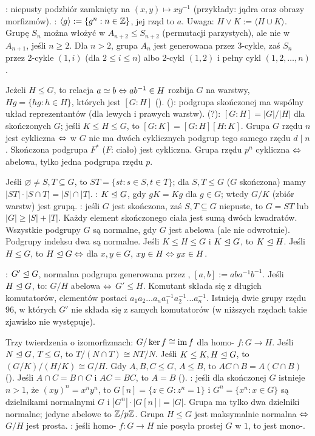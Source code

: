 :  niepusty podzbiór zamknięty na $(x, y) \mapsto xy^{-1}$ (przykłady: jądra oraz obrazy morfizmów).
: $\langle g \rangle := \{g^n : n \in \mathbb{Z}\}$, jej rząd to  $a$.
Uwaga: $H \vee K := \langle H \cup K \rangle$.
Grupę $S_n$ można włożyć w $A_{n+2} \le S_{n+2}$ (permutacji parzystych), ale nie w $A_{n+1}$, jeśli $n \ge 2$.
Dla $n > 2$, grupa $A_n$ jest generowana przez 3-cykle, zaś $S_n$ przez 2-cykle $(1, i)$ (dla $2 \le i \le n$) albo 2-cykl $(1, 2)$ i pełny cykl $(1, 2, \ldots, n)$.

Jeżeli  $H \le G$, to  relacja $a \simeq b \Leftrightarrow ab^{-1} \in H$ rozbija $G$ na warstwy, $Hg = \{hg : h \in H\}$, których jest $[G:H]$ ().
 (): podgrupa skończonej ma wspólny układ reprezentantów (dla lewych i prawych warstw).
 (?): $[G:H] = |G|/|H|$ dla skończonych $G$; jeśli $K \le H \le G$, to $[G:K] = [G:H][H:K]$.
Grupa $G$ rzędu $n$ jest cykliczna $\Leftrightarrow$ w $G$ nie ma dwóch cyklicznych podgrup tego samego rzędu $d \mid n$.
Skończona podgrupa $F^*$ ($F$: ciało) jest cykliczna.
Grupa rzędu $p^n$ cykliczna $\Leftrightarrow$ abelowa, tylko jedna podgrupa rzędu $p$.

Jeśli $\varnothing \neq S,T \subseteq G$,  to $ST = \{st : s \in S, t \in T\}$; dla $S, T \le G$ ($G$ skończona) mamy $|ST| \cdot |S \cap T| = |S| \cap |T|$.
: $K \trianglelefteq G$, gdy $g K = Kg$ dla $g \in G$; wtedy $G/K$ (zbiór warstw) jest grupą.
: jeśli $G$ jest skończona, zaś $S, T \subseteq G$ niepuste, to $G=ST$ lub $|G| \ge |S| + |T|$.
Każdy element skończonego ciała jest sumą dwóch kwadratów.
Wszystkie podgrupy $G$ są normalne, gdy $G$ jest abelowa (ale nie odwrotnie).
Podgrupy indeksu dwa są normalne.
Jeśli $K \le H \le G$ i $K \trianglelefteq G$, to $K \trianglelefteq H$.
Jeśli $H \le G$, to $H \trianglelefteq G \Leftrightarrow$ dla $x, y \in G$, $xy \in H \Leftrightarrow yx \in H$.

:  $G' \trianglelefteq G$, normalna podgrupa generowana przez , $[a,b] := aba^{-1}b^{-1}$.
Jeśli $H \trianglelefteq G$, to: $G/H$ abelowa $\Leftrightarrow$ $G' \le H$.
Komutant składa się z długich komutatorów, elementów postaci $a_1a_2\ldots a_na_1^{-1}a_2^{-1}\ldots  a_n^{-1}$.
Istnieją dwie grupy rzędu 96, w których $G'$ nie składa się z samych komutatorów (w niższych rzędach takie zjawisko nie występuje).

Trzy  twierdzenia o izomorfizmach: $G / \ker f \cong \operatorname{im} f$ dla homo- $f \colon G \to H$.
Jeśli $N \trianglelefteq G$, $T \le G$, to $T/(N \cap T) \cong NT/N$.
Jeśli $K \le K, H \trianglelefteq G$, to $(G/K) / (H/K) \cong G/H$.
Gdy $A,B,C \le G$, $A \le B$, to $AC \cap B = A(C \cap B)$ ().
Jeśli $A \cap C = B \cap C$ i $AC = BC$, to $A = B$ ().
:  jeśli dla skończonej $G$ istnieje $n > 1$, że $(xy)^n = x^ny^n$, to $G[n] = \{z \in G : z^n = 1\}$ i $G^n = \{x^n : x\in G\}$ są dzielnikami normalnymi $G$ i $|G^n| \cdot |G[n]| = |G|$.
Grupa  ma tylko dwa dzielniki normalne; jedyne abelowe to $\mathbb{Z}/p\mathbb{Z}$.
Grupa $H \le G$ jest maksymalnie normalna $\Leftrightarrow$ $G/H$ jest prosta.
: jeśli homo- $f \colon G \to H$ nie posyła prostej $G$ w $1$, to jest mono-.

